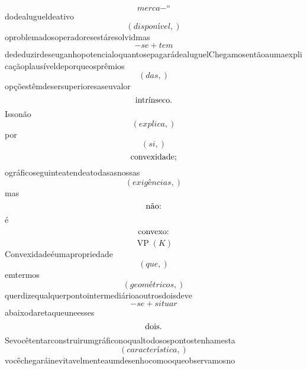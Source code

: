 \documentclass{article}
\begin{document}
\begin{equation}
merca - “
\end{equation}dodealugueldeativo\begin{equation}
\left( disponível,\right)
\end{equation}oproblemadosoperadoresestáresolvidmas\begin{equation}
- se + tem
\end{equation}dededuzirdeseuganhopotencialoquantosepagarádealuguelChegamosentãoaumaexplicaçãoplausíveldeporqueosprêmios\begin{equation}
\left( das,\right)
\end{equation}opçõestêmdesersuperioresaseuvalor\begin{equation}
$intrínseco.$
\end{equation}Issonão\begin{equation}
\left( explica,\right)
\end{equation}por\begin{equation}
\left( si,\right)
\end{equation}\begin{equation}
$convexidade;$
\end{equation}ográficoseguinteatendeatodasasnossas\begin{equation}
\left( exigências,\right)
\end{equation}mas\begin{equation}
$não:$
\end{equation}é\begin{equation}
$convexo:$
\end{equation}\begin{equation}
\operatorname{VP}{\left(K \right)}
\end{equation}Convexidadeéumapropriedade\begin{equation}
\left( que,\right)
\end{equation}emtermos\begin{equation}
\left( geométricos,\right)
\end{equation}querdizequalquerpontointermediárioaoutrosdoisdeve\begin{equation}
- se + situar
\end{equation}abaixodaretaqueuneesses\begin{equation}
$dois.$
\end{equation}Sevocêtentarconstruirumgráficonoqualtodosospontostenhamesta\begin{equation}
\left( característica,\right)
\end{equation}vocêchegaráinevitavelmenteaumdesenhocomooqueobservamosno\begin{equation}

\end{equation}
\end{document}

